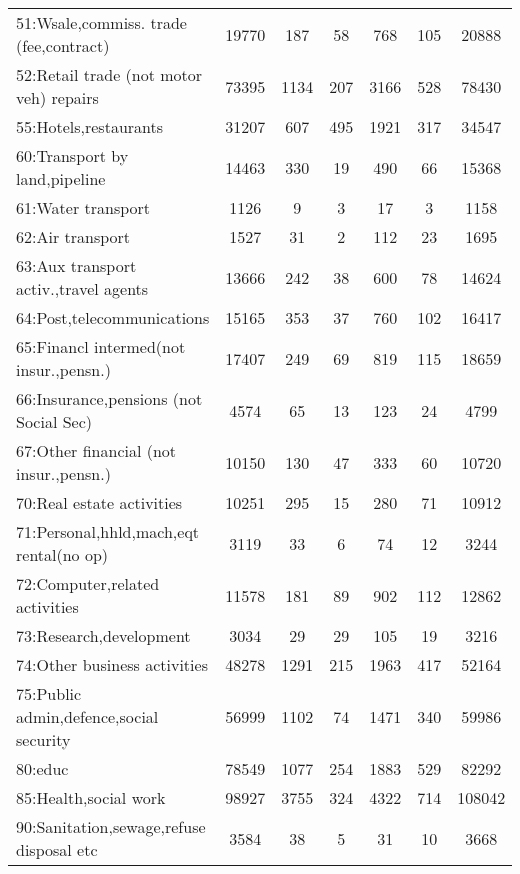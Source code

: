 {\begin{longtable}{l*{6}{c}}
51:Wsale,commiss. trade (fee,contract)&    19770&      187&       58&      768&      105&    20888\\
52:Retail trade (not motor veh) repairs&    73395&     1134&      207&     3166&      528&    78430\\
55:Hotels,restaurants&    31207&      607&      495&     1921&      317&    34547\\
60:Transport by land,pipeline&    14463&      330&       19&      490&       66&    15368\\
61:Water transport&     1126&        9&        3&       17&        3&     1158\\
62:Air transport&     1527&       31&        2&      112&       23&     1695\\
63:Aux transport activ.,travel agents&    13666&      242&       38&      600&       78&    14624\\
64:Post,telecommunications&    15165&      353&       37&      760&      102&    16417\\
65:Financl intermed(not insur.,pensn.)&    17407&      249&       69&      819&      115&    18659\\
66:Insurance,pensions (not Social Sec)&     4574&       65&       13&      123&       24&     4799\\
67:Other financial (not insur.,pensn.)&    10150&      130&       47&      333&       60&    10720\\
70:Real estate activities&    10251&      295&       15&      280&       71&    10912\\
71:Personal,hhld,mach,eqt rental(no op)&     3119&       33&        6&       74&       12&     3244\\
72:Computer,related activities&    11578&      181&       89&      902&      112&    12862\\
73:Research,development&     3034&       29&       29&      105&       19&     3216\\
74:Other business activities&    48278&     1291&      215&     1963&      417&    52164\\
75:Public admin,defence,social security&    56999&     1102&       74&     1471&      340&    59986\\
80:educ   &    78549&     1077&      254&     1883&      529&    82292\\
85:Health,social work&    98927&     3755&      324&     4322&      714&   108042\\
90:Sanitation,sewage,refuse disposal etc&     3584&       38&        5&       31&       10&     3668\\

\end{longtable}}
